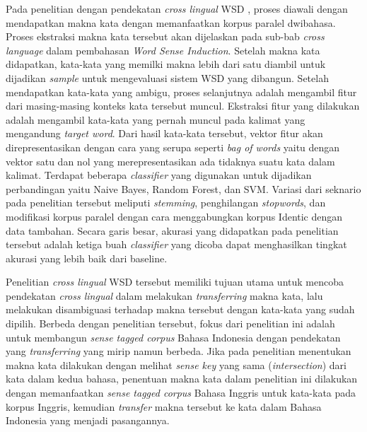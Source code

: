 Pada penelitian dengan pendekatan \textit{cross lingual} WSD \citep{septiantri2013wsd}, proses diawali dengan mendapatkan makna kata dengan memanfaatkan korpus paralel dwibahasa. Proses ekstraksi makna kata tersebut akan dijelaskan pada sub-bab \textit{cross language} dalam pembahasan \textit{Word Sense Induction}. Setelah makna kata didapatkan, kata-kata yang memilki makna lebih dari satu diambil untuk dijadikan \textit{sample} untuk mengevaluasi sistem WSD yang dibangun. Setelah mendapatkan kata-kata yang ambigu, proses selanjutnya adalah mengambil fitur dari masing-masing konteks kata tersebut muncul. Ekstraksi fitur yang dilakukan adalah mengambil kata-kata yang pernah muncul pada kalimat yang mengandung \textit{target word}. Dari hasil kata-kata tersebut, vektor fitur akan direpresentasikan dengan cara yang serupa seperti \textit{bag of words} yaitu dengan vektor satu dan nol yang merepresentasikan ada tidaknya suatu kata dalam kalimat. Terdapat beberapa \textit{classifier} yang digunakan untuk dijadikan perbandingan yaitu Naive Bayes, Random Forest, dan SVM. Variasi dari seknario pada penelitian tersebut meliputi \textit{stemming}, penghilangan \textit{stopwords}, dan modifikasi korpus paralel dengan cara menggabungkan korpus Identic dengan data tambahan. Secara garis besar, akurasi yang didapatkan pada penelitian tersebut adalah ketiga buah \textit{classifier} yang dicoba dapat menghasilkan tingkat akurasi yang lebih baik dari baseline.

Penelitian \textit{cross lingual} WSD \citep{septiantri2013wsd} tersebut memiliki tujuan utama untuk mencoba pendekatan \textit{cross lingual} dalam melakukan \textit{transferring} makna kata, lalu melakukan disambiguasi terhadap makna tersebut dengan kata-kata yang sudah dipilih. Berbeda dengan penelitian tersebut, fokus dari penelitian ini adalah untuk membangun \textit{sense tagged corpus} Bahasa Indonesia dengan pendekatan yang \textit{transferring} yang mirip namun berbeda. Jika pada penelitian \citep{septiantri2013wsd} menentukan makna kata dilakukan dengan melihat \textit{sense key} yang sama (\textit{intersection}) dari kata dalam kedua bahasa, penentuan makna kata dalam penelitian ini dilakukan dengan memanfaatkan \textit{sense tagged corpus} Bahasa Inggris untuk kata-kata pada korpus Inggris, kemudian \textit{transfer} makna tersebut ke kata dalam Bahasa Indonesia yang menjadi pasangannya.
